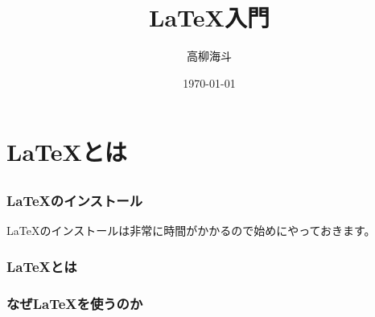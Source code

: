 \documentclass{beamer}                 %
\title{\LaTeX 入門}
\author{高柳海斗}
\institute[名大数理B3]{名古屋大学理学部数理学科 B3}
\date{\today}
\begin{document}
\begin{frame}
  \titlepage
\end{frame}

\section{\LaTeX とは}
\subsection{}

\begin{frame}
  \frametitle{\LaTeX のインストール}
  \LaTeX のインストールは非常に時間がかかるので始めにやっておきます。
\end{frame}

\begin{frame}
  \frametitle{\LaTeX とは}
\end{frame}

\begin{frame}
  \frametitle{なぜ\LaTeX を使うのか}
\end{frame}
\end{document}
